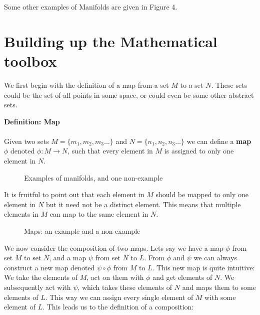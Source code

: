 \documentclass[10pt]{article}
\begin{document}
Some other examples of Manifolds are given in Figure 4. 



\section{Building up the Mathematical toolbox}

We first begin with the definition of a map from a set $M$ to a set $N$. These sets could be the set of all points in some space, or could even be some other abstract sets.\\



\begin{tcolorbox}
\textbf{Definition: Map} \\ \\ Given two sets $M = \{m_1,m_2,m_3 ...\}$ and $N = \{n_1,n_2,n_3 ...\}$ we can define a \textbf{map} $\phi$ denoted $\phi: M \rightarrow N$, such that every element in $M$ is assigned to only one element in $N$. 
\end{tcolorbox}

\begin{figure}[h!]
\centering

\caption{Examples of manifolds, and one non-example}
\label{fig:my_label 2}
\end{figure}

It is fruitful to point out that each element in $M$ should be mapped to only one element in $N$ but it need not be a distinct element. This means that multiple elements in $M$ can map to the same element in $N$. 

\begin{figure}[h!]
\centering

\caption{Maps: an example and a non-example}
\label{fig:my_label 2}
\end{figure}

We now consider the composition of two maps. Lets say we have a map $\phi$ from set $M$ to set $N$, and a map $\psi$ from set $N$ to $L$. From $\phi$ and $\psi$ we can always construct a new map denoted $\psi \circ \phi$ from $M$ to $L$. This new map is quite intuitive: We take the elements of $M$, act on them with $\phi$ and get elements of $N$. We subsequently act with $\psi$, which takes these elements of $N$ and maps them to some elements of $L$. This way we can assign every single element of $M$ with some element of $L$. This leads us to the definition of a composition:
\\
\end{document}
